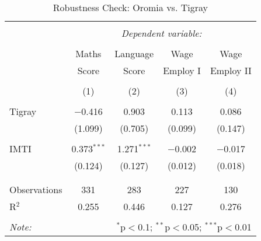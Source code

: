 

\begin{table}[!htbp] \centering 
  \caption{Robustness Check: Oromia vs. Tigray} 
  \label{} 
\begin{tabular}{@{\extracolsep{5pt}}lcccc} 
\\[-1.8ex]\hline 
\hline \\[-1.8ex] 
 & \multicolumn{4}{c}{\textit{Dependent variable:}} \\ 
\cline{2-5} 
\\[-1.8ex] & Maths & Language & Wage & Wage \\ 
 & Score & Score & Employ I & Employ II \\
\\[-1.8ex] & (1) & (2) & (3) & (4)\\ 
\hline \\[-1.8ex] 
 Tigray & $-$0.416 & 0.903 & 0.113 & 0.086 \\ 
  & (1.099) & (0.705) & (0.099) & (0.147) \\ 
  & & & & \\ 
 IMTI & 0.373$^{***}$ & 1.271$^{***}$ & $-$0.002 & $-$0.017 \\ 
  & (0.124) & (0.127) & (0.012) & (0.018) \\ 
  & & & & \\ 
\hline \\[-1.8ex] 
Observations & 331 & 283 & 227 & 130 \\ 
R$^{2}$ & 0.255 & 0.446 & 0.127 & 0.276 \\ 
\hline 
\hline \\[-1.8ex] 
\textit{Note:}  & \multicolumn{4}{r}{$^{*}$p$<$0.1; $^{**}$p$<$0.05; $^{***}$p$<$0.01} \\ 
\end{tabular} 
\end{table} 



